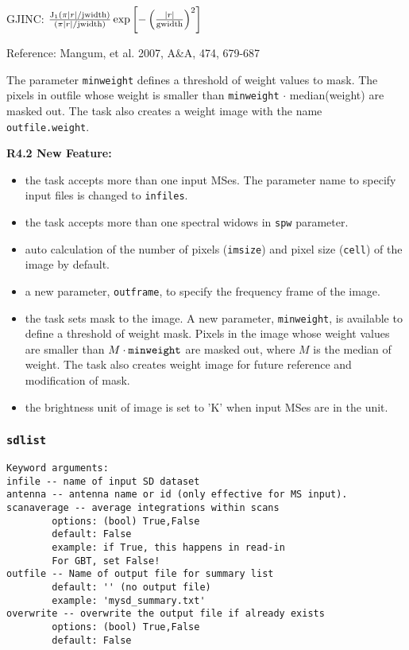    GJINC: $ \frac{ {\rm J}_1 \left( \pi |r| / {\rm jwidth} \right)}{\left( \pi |r| / {\rm jwidth} \right)} \exp \left[ - \left( \frac{|r|}{\rm gwidth} \right)^2 \right] $  

Reference: Mangum, et al. 2007, A\&A, 474, 679-687 

The parameter {\tt minweight} defines a threshold of weight values 
to mask. The pixels in outfile whose weight is smaller than
{\tt minweight} $ \cdot $ median(weight) are masked out. The task also creates
a weight image with the name {\tt outfile.weight}.


\medskip
{\bf R4.2 New Feature:}
\begin{itemize}
\item the task accepts more than one input MSes. 
The parameter name to specify input files is changed to {\tt infiles}.
\item the task accepts more than one spectral widows in {\tt spw} parameter.
\item auto calculation of the number of pixels ({\tt imsize}) and
pixel size ({\tt cell}) of the image by default.
\item a new parameter, {\tt outframe}, to specify the frequency frame
of the image.
\item the task sets mask to the image. A new parameter, {\tt minweight}, 
is available to define a threshold of weight mask. 
Pixels in the image whose weight values are smaller than 
$ M \cdot {\tt minweight} $ are masked out, where $ M $ is the median of weight. 
The task also creates weight image for future reference and modification 
of mask.
\item the brightness unit of image is set to 'K' when input MSes are in the unit.
\end{itemize}
 


\subsubsection{{\tt sdlist}}
\label{section:sd.sdtasks.tasks.sdlist}

\begin{verbatim}
Keyword arguments:
infile -- name of input SD dataset
antenna -- antenna name or id (only effective for MS input). 
scanaverage -- average integrations within scans
        options: (bool) True,False
        default: False
        example: if True, this happens in read-in
        For GBT, set False!
outfile -- Name of output file for summary list
        default: '' (no output file)
        example: 'mysd_summary.txt'
overwrite -- overwrite the output file if already exists
        options: (bool) True,False
        default: False
\end{verbatim}
    
